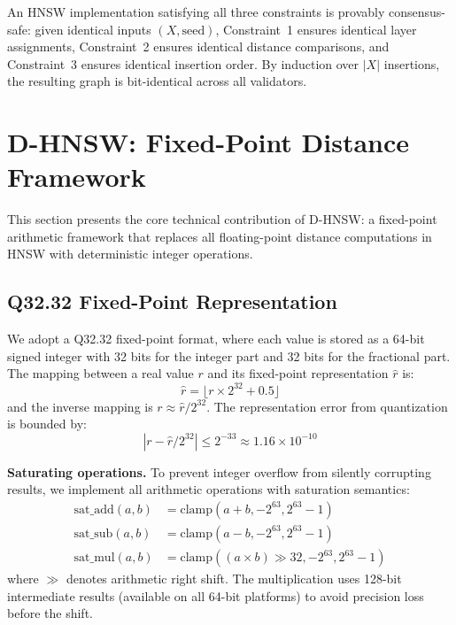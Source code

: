 \documentclass[10pt,journal]{IEEEtran}
\newcommand{\dhnsw}{\textsc{D-HNSW}}
\newcommand{\hnsw}{\textsc{HNSW}}
\begin{document}
An \hnsw{} implementation satisfying all three constraints is provably consensus-safe: given identical inputs $(X, \text{seed})$, Constraint~1 ensures identical layer assignments, Constraint~2 ensures identical distance comparisons, and Constraint~3 ensures identical insertion order. By induction over $|X|$ insertions, the resulting graph is bit-identical across all validators.


\section{D-HNSW: Fixed-Point Distance Framework}
\label{sec:method}

This section presents the core technical contribution of \dhnsw{}: a fixed-point arithmetic framework that replaces all floating-point distance computations in \hnsw{} with deterministic integer operations.

\subsection{Q32.32 Fixed-Point Representation}

We adopt a Q32.32 fixed-point format, where each value is stored as a 64-bit signed integer with 32 bits for the integer part and 32 bits for the fractional part. The mapping between a real value $r$ and its fixed-point representation $\hat{r}$ is:
\begin{equation}
  \label{eq:fp_encode}
  \hat{r} = \lfloor r \times 2^{32} + 0.5 \rfloor
\end{equation}
and the inverse mapping is $r \approx \hat{r} / 2^{32}$. The representation error from quantization is bounded by:
\begin{equation}
  |r - \hat{r}/2^{32}| \leq 2^{-33} \approx 1.16 \times 10^{-10}
\end{equation}

\textbf{Saturating operations.} To prevent integer overflow from silently corrupting results, we implement all arithmetic operations with saturation semantics:
\begin{align}
  \text{sat\_add}(a, b) &= \text{clamp}(a + b, -2^{63}, 2^{63}{-}1) \\
  \text{sat\_sub}(a, b) &= \text{clamp}(a - b, -2^{63}, 2^{63}{-}1) \\
  \text{sat\_mul}(a, b) &= \text{clamp}((a \times b) \gg 32, -2^{63}, 2^{63}{-}1)
\end{align}
where $\gg$ denotes arithmetic right shift. The multiplication uses 128-bit intermediate results (available on all 64-bit platforms) to avoid precision loss before the shift.
\end{document}
